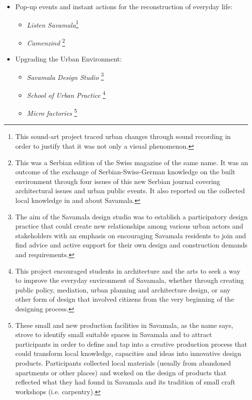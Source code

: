 \documentclass[11pt]{report}
\begin{document}
\begin{itemize}
\item Pop-up events and instant actions for the reconstruction of everyday life:

\begin{itemize}
\item \textit{Listen Savamala}\footnote{This sound-art project traced urban changes through sound recording in order to justify that it was not only a visual phenomenon.}

\item \textit{Camenzind}
\footnote{This was a Serbian edition of the Swiss magazine of the same name. It was an outcome of the exchange of Serbian-Swiss-German knowledge on the built environment through four issues of this new Serbian journal covering architectural issues and urban public events. It also reported on the collected local knowledge in and about Savamala.}
\end{itemize}

\item Upgrading the Urban Environment:
\begin{itemize}
\item \textit{Savamala Design Studio}
\footnote{The aim of the Savamala design studio was to establish a participatory design practice that could create new relationships among various urban actors and stakeholders with an emphasis on encouraging Savamala residents to join and find advice and active support for their own design and construction demands and requirements.}

\item \textit{School of Urban Practice}
\footnote{This project encouraged students in architecture and the arts to seek a way to improve the everyday environment of Savamala, whether through creating public policy, mediation, urban planning and architecture design, or any other form of design that involved citizens from the very beginning of the designing process.}

\item \textit{Micro factories}
\footnote{These small and new production facilities in Savamala, as the name says, strove to identify small suitable spaces in Savamala and to attract participants in order to define and tap into a creative production process that could transform local knowledge, capacities and ideas into innovative design products.
Participants collected local materials (usually from abandoned apartments or other places) and worked on the design of products that reflected what they had found in Savamala and its tradition of small craft workshops (i.e. carpentry).}
\end{itemize}
\end{itemize}
\end{document}
